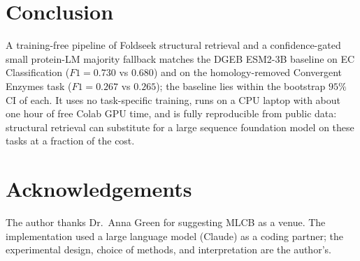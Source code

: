 \documentclass[11pt,letterpaper]{article}
\begin{document}
\section{Conclusion}

A training-free pipeline of Foldseek structural retrieval and a
confidence-gated small protein-LM majority fallback matches the DGEB
ESM2-3B baseline on EC Classification ($F1 = 0.730$ vs $0.680$) and on
the homology-removed Convergent Enzymes task ($F1 = 0.267$ vs $0.265$);
the baseline lies within the bootstrap $95\%$ CI of each. It uses no
task-specific training, runs on a CPU laptop with about one hour of
free Colab GPU time, and is fully reproducible from public data:
structural retrieval can substitute for a large sequence foundation
model on these tasks at a fraction of the cost.

\section*{Acknowledgements}

The author thanks Dr.\ Anna Green for suggesting MLCB as a venue. The
implementation used a large language model (Claude) as a coding
partner; the experimental design, choice of methods, and
interpretation are the author's.



\end{document}
